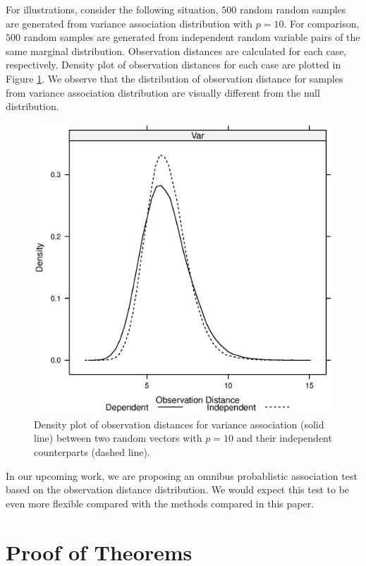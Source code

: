 \documentclass{sig-alternate}
\begin{document}
For illustrations, consider the following situation, $500$ random
\iid{} random samples are generated from variance association
distribution with $p=10$. For comparison, $500$ random samples are
generated from independent random variable pairs of the same marginal
distribution. Observation distances are calculated for each case,
respectively. Density plot of observation distances for each case are
plotted in Figure \ref{fig:discussion-distance-distribution}. We
observe that the distribution of observation distance for samples from
variance association distribution are visually different from the null
distribution.
\begin{figure}
  \centering
  \includegraphics[width=.25\textwidth,height=.25\textwidth]{../code/visualize/plot/distance-dist.eps}
  \caption{Density plot of observation distances for variance
    association (solid line) between two random vectors with $p=10$
    and their independent counterparts (dashed line).}
  \label{fig:discussion-distance-distribution}
\end{figure}
In our upcoming work, we are proposing an omnibus probablistic
association test based on the observation distance distribution. We
would expect this test to be even more flexible compared with the
methods compared in this paper. 

\appendix{}

\section{Proof of Theorems}
\label{sec:proof}
\end{document}
